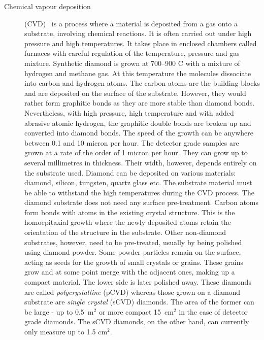 \documentclass[twoside,12pt]{packages/mytustyle}  %
\begin{document}
\begin{description}
\item[Chemical vapour deposition] (CVD)~\cite{} is a process where a material is deposited from a gas onto a substrate, involving chemical reactions. It is often carried out under high pressure and high temperatures. It takes place in enclosed chambers called furnaces with careful regulation of the temperature, pressure and gas mixture. Synthetic diamond is grown at 700--900 \textdegree C with a mixture of hydrogen and methane gas. At this temperature the molecules dissociate into carbon and hydrogen atoms. The carbon atoms are the building blocks and are deposited on the surface of the substrate. However, they would rather form graphitic bonds as they are more stable than diamond bonds. Nevertheless, with high pressure, high temperature and with added abrasive atomic hydrogen, the graphitic double bonds are broken up and converted into diamond bonds. The speed of the growth can be anywhere between 0.1 and 10 micron per hour. The detector grade samples are grown at a rate of the order of 1 micron per hour. They can grow up to several millimetres in thickness. Their width, however, depends entirely on the substrate used. Diamond can be deposited on various materials: diamond, silicon, tungsten, quartz glass etc. The substrate material must be able to withstand the high temperatures during the CVD process. The diamond substrate does not need any surface pre-treatment. Carbon atoms form bonds with atoms in the existing crystal structure. This is the homoepitaxial growth where the newly deposited atoms retain the orientation of the structure in the substrate. Other non-diamond substrates, however, need to be pre-treated, usually by being polished using diamond powder. Some powder particles remain on the surface, acting as seeds for the growth of small crystals or grains. These grains grow and at some point merge with the adjacent ones, making up a compact material. The lower side is later polished away. These diamonds are called \emph{polycrystalline} (pCVD) whereas those grown on a diamond substrate are \emph{single crystal} (sCVD) diamonds. The area of the former can be large - up to 0.5~m$^2$ or more compact 15~cm$^2$ in the case of detector grade diamonds. The sCVD diamonds, on the other hand, can currently only measure up to 1.5 cm$^2$.
\end{description}




{}




\end{document}
